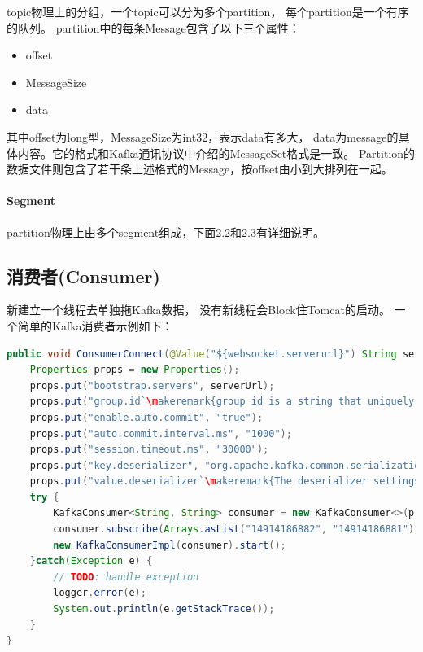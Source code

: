 \documentclass{book}
\newcounter{coderemarks}   %
\newcommand{\circlemark}[1]{%
\tikz\node[text=white,font=\sffamily\bfseries,inner sep=0.2mm,draw,circle,fill=black]{#1};}
\newcommand{\makeremark}[1]{%
\circlemark{\arabic{coderemarks}}%
\global \expandafter\def \csname codebox\the\value{coderemarks}\endcsname{#1}%
\stepcounter{coderemarks}}
\begin{document}
topic物理上的分组，一个topic可以分为多个partition，
每个partition是一个有序的队列。
partition中的每条Message包含了以下三个属性：

\begin{itemize}
	\item{offset}
	\item{MessageSize}
	\item{data}
\end{itemize}

其中offset为long型，MessageSize为int32，表示data有多大，
data为message的具体内容。它的格式和Kafka通讯协议中介绍的MessageSet格式是一致。
Partition的数据文件则包含了若干条上述格式的Message，按offset由小到大排列在一起。

\paragraph{Segment}

partition物理上由多个segment组成，下面2.2和2.3有详细说明。

\subsection{消费者(Consumer)}

新建立一个线程去单独拖Kafka数据，
没有新线程会Block住Tomcat的启动。
一个简单的Kafka消费者示例如下：

\begin{lstlisting}[language=Java]
public void ConsumerConnect(@Value("${websocket.serverurl}") String serverUrl) throws Exception {
	Properties props = new Properties();
	props.put("bootstrap.servers", serverUrl);
	props.put("group.id`\makeremark{group id is a string that uniquely identifies a set of consumers within the same consumer group.}`", "test789");
	props.put("enable.auto.commit", "true");
	props.put("auto.commit.interval.ms", "1000");
	props.put("session.timeout.ms", "30000");
	props.put("key.deserializer", "org.apache.kafka.common.serialization.StringDeserializer");
	props.put("value.deserializer`\makeremark{The deserializer settings specify how to turn bytes into objects. For example, by specifying string deserializers, we are saying that our record's key and value will just be simple strings.}`", "org.apache.kafka.common.serialization.StringDeserializer");
	try {
		KafkaConsumer<String, String> consumer = new KafkaConsumer<>(props);
		consumer.subscribe(Arrays.asList("14914186882", "14914186881"));
		new KafkaComsumerImpl(consumer).start();
	}catch(Exception e) {
		// TODO: handle exception
		logger.error(e);
		System.out.println(e.getStackTrace());
	}
}
\end{lstlisting}
\end{document}
